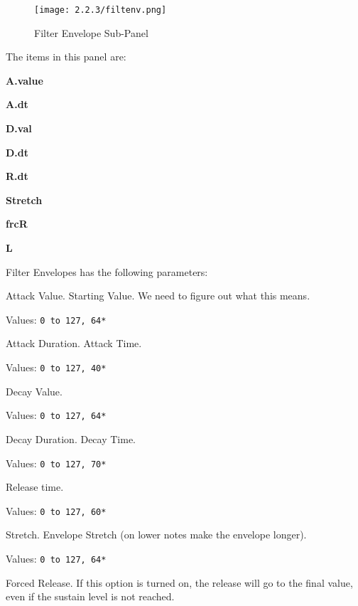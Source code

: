 \begin{figure}[H]
   \centering
    \texttt{[image: 2.2.3/filtenv.png]}
   \caption[Filter Envelope Sub-Panel]{Filter Envelope Sub-Panel}
   \label{fig:filter_env}
\end{figure}

   The items in this panel are:

   \begin{enumber}
      \item \textbf{A.value}
      \item \textbf{A.dt}
      \item \textbf{D.val}
      \item \textbf{D.dt}
      \item \textbf{R.dt}
      \item \textbf{Stretch}
      \item \textbf{frcR}
      \item \textbf{L}
   \end{enumber}

   Filter Envelopes has the following parameters:

   \setcounter{ItemCounter}{0}      %

   Attack Value.  Starting Value.
   We need to figure out what this means.

   Values: \texttt{0 to 127, 64*}

   Attack Duration.  Attack Time.

   Values: \texttt{0 to 127, 40*}

   Decay Value.

   Values: \texttt{0 to 127, 64*}

   Decay Duration.  Decay Time.

   Values: \texttt{0 to 127, 70*}

   Release time.

   Values: \texttt{0 to 127, 60*}

   Stretch.
   Envelope Stretch (on lower notes make the envelope longer).

   Values: \texttt{0 to 127, 64*}

   Forced Release.
   If this option is turned on, the release will go to the
   final value, even if the sustain level is not reached.

